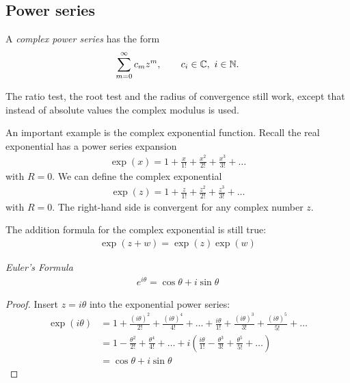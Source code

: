 \subsection{Power series}
\begin{df}
	A \emph{complex power series} has the form
	\begin{align*}
	\sum_{m=0}^\infty c_m z^m, \qquad c_i \in \mathbb C,~ i \in \mathbb N.
	\end{align*} 
\end{df}

The ratio test, the root test and the radius of convergence still work, except that instead of absolute values the complex modulus is used. 

\begin{ex}
	An important example is the complex exponential function. Recall the real exponential has a power series expansion
	\begin{align*}
	\exp(x) = 1 + \frac x {1!} + \frac{x^2}{2!} + \frac{x^3}{3!} + \dots
	\end{align*}
	with $R=0$.
	We can define the complex exponential
	\begin{align*}
	\exp(z) = 1 + \frac z {1!} + \frac{z^2}{2!} + \frac{z^3}{3!} + \dots
	\end{align*}
	with $R=0$. The right-hand side is convergent for any complex number $z$.
\end{ex}


The addition formula for the complex exponential is still true:
\begin{align*}
\exp(z+w) = \exp(z) \exp(w)
\end{align*}


\begin{tm}
	\emph{Euler's Formula} 
	\begin{align*}
	e^{i \theta} = \cos \theta + i \sin \theta 
	\end{align*}
\end{tm}

\begin{proof}
	Insert $z = i \theta$ into the exponential power series:
	\begin{align*}
	\exp(i \theta) & = 1 +  \frac{(i \theta)^2}{2!} + \frac{(i \theta)^4}{4!} + \dots + \frac {i \theta} {1!} + \frac{(i \theta)^3}{3!} + \frac{(i \theta)^5}{5!} + \dots \\
	& = 1 -  \frac{\theta^2}{2!} + \frac{ \theta^4}{4!} + \dots + i \left(\frac {i \theta} {1!} - \frac{ \theta^3}{3!} + \frac{ \theta^5}{5!} + \dots \right) \\
	& = \cos \theta + i \sin \theta
	\end{align*}
\end{proof}

